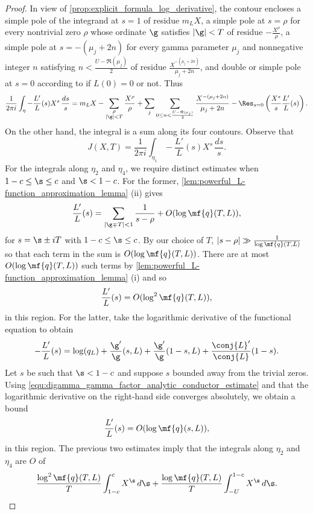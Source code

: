 \documentclass[12pt]{article}
\begin{document}
\begin{proof}
        \noindent In view of \cref{prop:explicit_formula_log_derivative}, the contour encloses a simple pole of the integrand at \(s = 1\) of residue \(m_{L}X\), a simple pole at \(s = \rho\) for every nontrivial zero \(\rho\) whose ordinate \(\g\) satisfies \(|\g| < T\) of residue \(-\frac{X^{\rho}}{\rho}\), a simple pole at \(s = -(\mu_{j}+2n)\) for every gamma parameter \(\mu_{j}\) and nonnegative integer \(n\) satisfying \(n < \frac{U-\Re(\mu_{j})}{2}\) of residue \(\frac{X^{-(\mu_{j}+2n)}}{\mu_{j}+2n}\), and double or simple pole at \(s = 0\) according to if \(L(0) = 0\) or not. Thus
        \[
          \frac{1}{2\pi i}\int_{\eta}-\frac{L'}{L}(s)X^{s}\,\frac{ds}{s} = m_{L}X-\sum_{\substack{\rho \\ |\g| < T}}\frac{X^{\rho}}{\rho}+\sum_{j}\sum_{0 \le n < \frac{U-\Re(\mu_{j})}{2}}\frac{X^{-(\mu_{j}+2n)}}{\mu_{j}+2n}-\Res_{s = 0}\left(\frac{X^{s}}{s}\frac{L'}{L}(s)\right).
        \]
        On the other hand, the integral is a sum along its four contours. Observe that
        \[
          J(X,T) = \frac{1}{2\pi i}\int_{\eta_{1}}-\frac{L'}{L}(s)X^{s}\,\frac{ds}{s}.
        \]
        For the integrals along \(\eta_{2}\) and \(\eta_{4}\), we require distinct estimates when \(1-c \le \s \le c\) and \(\s < 1-c\). For the former, \cref{lem:powerful_L-function_approximation_lemma} (ii) gives
        \[
          \frac{L'}{L}(s) = \sum_{|\g\mp T| < 1}\frac{1}{s-\rho}+O(\log\mf{q}(T,L)),
        \]
        for \(s = \s\pm iT\) with \(1-c \le \s \le c\). By our choice of \(T\), \(|s-\rho| \gg \frac{1}{\log\mf{q}(T,L)}\) so that each term in the sum is \(O(\log\mf{q}(T,L))\). There are at most \(O(\log\mf{q}(T,L))\) such terms by \cref{lem:powerful_L-function_approximation_lemma} (i) and so
        \[
          \frac{L'}{L}(s) = O(\log^{2}\mf{q}(T,L)),
        \]
        in this region. For the latter, take the logarithmic derivative of the functional equation to obtain
        \[
          -\frac{L'}{L}(s) = \log(q_{L})+\frac{\g'}{\g}(s,L)+\frac{\g'}{\g}(1-s,L)+\frac{\conj{L}'}{\conj{L}}(1-s).
        \]
        Let \(s\) be such that \(\s < 1-c\) and suppose \(s\) bounded away from the trivial zeros. Using \cref{equ:digamma_gamma_factor_analytic_conductor_estimate} and that the logarithmic derivative on the right-hand side converges absolutely, we obtain a bound
        \[
          \frac{L'}{L}(s) = O(\log\mf{q}(s,L)),
        \]
        in this region. The previous two estimates imply that the integrals along \(\eta_{2}\) and \(\eta_{4}\) are \(O\) of
        \[
          \frac{\log^{2}\mf{q}(T,L)}{T}\int_{1-c}^{c}X^{\s}\,d\s+\frac{\log\mf{q}(T,L)}{T}\int_{-U}^{1-c}X^{\s}\,d\s.
\]
\end{proof}
\end{document}
